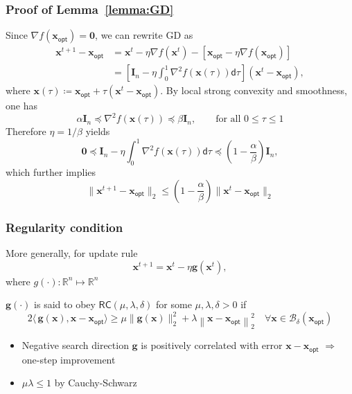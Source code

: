 \documentclass[compress,
mathserif,wide,%
]{beamer}
\begin{document}
\begin{frame}
	\frametitle{Proof of Lemma~\ref{lemma:GD}}
	Since $\nabla f(\bm{x}_{\mathsf{opt}}) = \bm{0}$, we can rewrite GD as
	\begin{align*}
		\bm{x}^{t+1} - \bm{x}_{\mathsf{opt}} &= \bm{x}^t - \eta \nabla f(\bm{x}^t) - [\bm{x}_{\mathsf{opt}} - \eta \nabla f(\bm{x}_{\mathsf{opt}})] \\
		&= \left[ \bm{I}_{n} - \eta \int_{0}^{1} \nabla^2 f (\bm{x}(\tau)) \mathsf{d}\tau \right ] (\bm{x}^t - \bm{x}_{\mathsf{opt}}),
	\end{align*}
	where $\bm{x}(\tau) \coloneqq \bm{x}_{\mathsf{opt}} + \tau (\bm{x}^t - \bm{x}_{\mathsf{opt}})$. By local strong convexity and smoothness, one has
	\[
	\alpha \bm{I}_{n} \preceq \nabla^2 f (\bm{x}(\tau)) \preceq \beta \bm{I}_{n}, \qquad \text{for all } 0 \leq \tau \leq 1
	\]
	Therefore $\eta = 1 / \beta$ yields
	\[
	\bm{0} \preceq \bm{I}_{n} - \eta \int_{0}^{1} \nabla^2 f (\bm{x}(\tau)) \mathsf{d}\tau \preceq (1 - \frac{\alpha}{\beta}) \bm{I}_{n},
	\]
	which further implies 
	\[
	\|\bm{x}^{t+1} -\bm{x}_{\mathsf{opt}}\|_2 \leq \left(1- {\frac{\alpha}{\beta}}  
\right)\|\bm{x}^{t} -\bm{x}_{\mathsf{opt}}\|_2
	\]
\end{frame}



\begin{frame}


\frametitle{Regularity condition}
More generally, for update rule
\[
\bm{x}^{t+1} = \bm{x}^t - \eta \bm{g}(\bm{x}^t),
\]
where $g(\cdot) : \mathbb{R}^{n} \mapsto \mathbb{R}^{n}$

\vfill
\begin{definition}
\label{def:reg-condition}
 $\bm{g}(\cdot)$ is said to obey $\mathsf{RC}( \mu,\lambda, \delta )$ for some $ \mu,\lambda, \delta >0 $ if 
\[
2 \langle\, \bm{g}(\bm{x}), \bm{x}-   \bm{x}_{\mathsf{opt}} \rangle\geq {\mu}\| \bm{g}(\bm{x})\|^2_2 + \lambda \left\| \bm{x}-   \bm{x}_{\mathsf{opt}} \right\|_2^2 \quad \forall \bm{x} \in \mathcal{B}_{\delta}(\bm{x}_{\mathsf{opt}})
\]
\end{definition}

\begin{itemize}
	\item Negative search direction $\bm{g}$ is positively correlated with error $\bm{x}-   \bm{x}_{\mathsf{opt}}$ $\Longrightarrow$ one-step improvement
	\item $\mu \lambda \leq 1$ by Cauchy-Schwarz
\end{itemize}
\end{frame}
\end{document}
